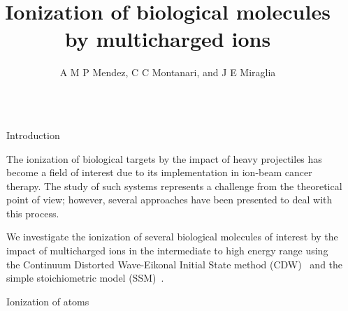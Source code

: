 \documentclass[final]{beamer}
\title{\Huge Ionization of biological molecules by multicharged ions}
\author{\Large 
 A M P Mendez, %
 C C Montanari,
 and J E Miraglia
}
\institute{Instituto de Astronom\'{\i}a y F\'{\i}sica del Espacio, CONICET--UBA}
\begin{document}

\begin{frame}[t] 
\begin{columns}[t] 
\begin{column}{.03\textwidth}
\end{column} %
\begin{column}{.46\textwidth} %
\vspace{-5mm}
\begin{block}{Introduction}
\justify

The \colorbox{tabutter}{ionization of biological targets} by the impact of heavy projectiles 
has become a field of interest due to its implementation in ion-beam 
cancer therapy. The study of such systems represents a challenge from 
the theoretical point of view; however, several approaches 
\cite{galassi2000,ludde2016} have been presented to deal with this process. 

We investigate the ionization of several biological molecules of 
interest by the impact of multicharged ions in the 
\colorbox{tabutter}{intermediate to high energy range} using the Continuum 
Distorted Wave-Eikonal Initial State
method (CDW)~\cite{fainstein1988} and the simple stoichiometric 
model (SSM)~\cite{mendez2019}. 

\vspace{0.5cm}

\end{block}
\begin{block}{Ionization of atoms}
\justify


\end{block}
\end{column}
\end{columns}
\end{frame}
\end{document}
